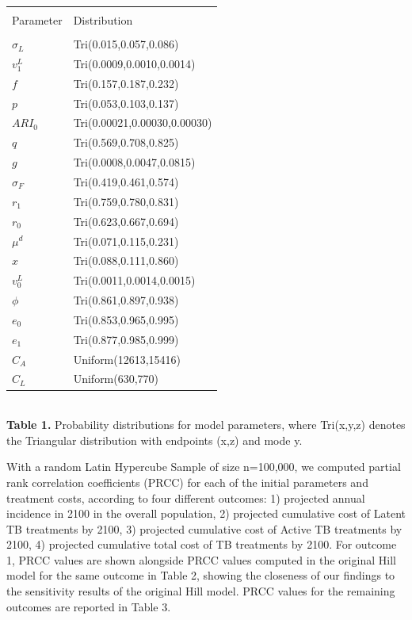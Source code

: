 \documentclass{amsart}
\begin{document}
\begin{table}[h]
\centering
\begin{tabular}{l l}
\hline\hline\\
Parameter & Distribution\\ [0.5ex]
\hline\\
$\sigma_{L}$  & Tri(0.015,0.057,0.086) \\
$v^{L}_{1}$   & Tri(0.0009,0.0010,0.0014) \\
$f$                 & Tri(0.157,0.187,0.232) \\
$p$                & Tri(0.053,0.103,0.137) \\
$ARI_{0}$      & Tri(0.00021,0.00030,0.00030) \\
$q$                & Tri(0.569,0.708,0.825) \\
$g$                & Tri(0.0008,0.0047,0.0815)  \\
$\sigma_{F}$ & Tri(0.419,0.461,0.574) \\
$r_{1}$          & Tri(0.759,0.780,0.831) \\
$r_{0}$          & Tri(0.623,0.667,0.694) \\
$\mu^{d}$      & Tri(0.071,0.115,0.231) \\
$x$                 & Tri(0.088,0.111,0.860) \\
$v^{L}_{0}$   & Tri(0.0011,0.0014,0.0015) \\
$\phi$            & Tri(0.861,0.897,0.938) \\
$e_{0}$          & Tri(0.853,0.965,0.995) \\
$e_{1}$          & Tri(0.877,0.985,0.999) \\
$C_{A}$           & Uniform(12613,15416) \\
$C_{L}$           & Uniform(630,770) \\ [1ex]
\hline
\end{tabular}\\[1ex]

{\bf Table 1.} Probability distributions for model parameters, where Tri(x,y,z) denotes the 
Triangular distribution with endpoints (x,z) and mode y.
\end{table}

With a random Latin Hypercube Sample of size n=100,000, we computed partial rank correlation coefficients (PRCC) for each of the initial parameters and treatment costs, according to four different outcomes: 1) projected annual incidence in 2100 in the overall population, 2) projected cumulative cost of Latent TB treatments by 2100, 3) projected cumulative cost of Active TB treatments by 2100, 4) projected cumulative total cost of TB treatments by 2100.  For outcome 1, PRCC values are shown alongside PRCC values computed in the original Hill model for the same outcome in Table 2, showing the closeness of our findings to the sensitivity results of the original Hill model.  PRCC values for the remaining outcomes are reported in Table 3.  \\
\end{document}

